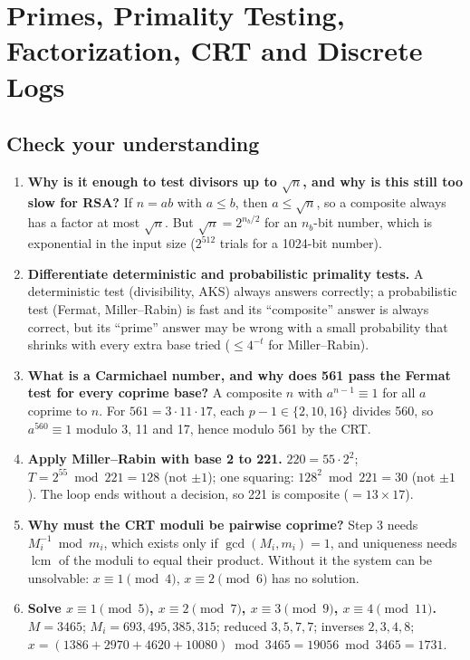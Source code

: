 \section{Primes, Primality Testing, Factorization, CRT and Discrete Logs}\label{q:12_primes_crt}

\subsection*{Check your understanding}
\begin{enumerate}[leftmargin=1.5em]
  \item \textbf{Why is it enough to test divisors up to $\sqrt n$, and why is this still too slow for RSA?} If $n = ab$ with $a \le b$, then $a \le \sqrt n$, so a composite always has a factor at most $\sqrt n$. But $\sqrt n = 2^{n_b/2}$ for an $n_b$-bit number, which is exponential in the input size ($2^{512}$ trials for a 1024-bit number).
  \item \textbf{Differentiate deterministic and probabilistic primality tests.} A deterministic test (divisibility, AKS) always answers correctly; a probabilistic test (Fermat, Miller--Rabin) is fast and its ``composite'' answer is always correct, but its ``prime'' answer may be wrong with a small probability that shrinks with every extra base tried ($\le 4^{-t}$ for Miller--Rabin).
  \item \textbf{What is a Carmichael number, and why does 561 pass the Fermat test for every coprime base?} A composite $n$ with $a^{n-1} \equiv 1$ for all $a$ coprime to $n$. For $561 = 3 \cdot 11 \cdot 17$, each $p - 1 \in \{2, 10, 16\}$ divides 560, so $a^{560} \equiv 1$ modulo 3, 11 and 17, hence modulo 561 by the CRT.
  \item \textbf{Apply Miller--Rabin with base 2 to 221.} $220 = 55 \cdot 2^2$; $T = 2^{55} \bmod 221 = 128$ (not $\pm1$); one squaring: $128^2 \bmod 221 = 30$ (not $\pm1$). The loop ends without a decision, so 221 is composite ($= 13 \times 17$).
  \item \textbf{Why must the CRT moduli be pairwise coprime?} Step 3 needs $M_i^{-1} \bmod m_i$, which exists only if $\gcd(M_i, m_i) = 1$, and uniqueness needs $\operatorname{lcm}$ of the moduli to equal their product. Without it the system can be unsolvable: $x \equiv 1 \pmod 4$, $x \equiv 2 \pmod 6$ has no solution.
  \item \textbf{Solve $x \equiv 1 \pmod 5$, $x \equiv 2 \pmod 7$, $x \equiv 3 \pmod 9$, $x \equiv 4 \pmod{11}$.} $M = 3465$; $M_i = 693, 495, 385, 315$; reduced $3, 5, 7, 7$; inverses $2, 3, 4, 8$; $x = (1386 + 2970 + 4620 + 10080) \bmod 3465 = 19056 \bmod 3465 = 1731$.

\end{enumerate}
